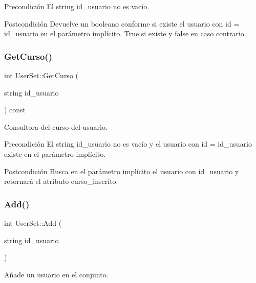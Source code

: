 \begin{DoxyPrecond}{Precondición}
El string id\+\_\+usuario no es vacío. 
\end{DoxyPrecond}
\begin{DoxyPostcond}{Postcondición}
Devuelve un booleano conforme si existe el usuario con id = id\+\_\+usuario en el parámetro implícito. True si existe y false en caso contrario. 
\end{DoxyPostcond}
\mbox{\label{class_user_set_a20c73031d173fac4db788598ea20ce79}} 
\subsubsection{\texorpdfstring{Get\+Curso()}{GetCurso()}}
{\footnotesize\ttfamily int User\+Set\+::\+Get\+Curso (\begin{DoxyParamCaption}\item[{string}]{id\+\_\+usuario }\end{DoxyParamCaption}) const}



Consultora del curso del usuario. 

\begin{DoxyPrecond}{Precondición}
El string id\+\_\+usuario no es vacío y el usuario con id = id\+\_\+usuario existe en el parámetro implícito. 
\end{DoxyPrecond}
\begin{DoxyPostcond}{Postcondición}
Busca en el parámetro implícito el usuario con id\+\_\+usuario y retornará el atributo curso\+\_\+inscrito. 
\end{DoxyPostcond}
\mbox{\label{class_user_set_af0b143d52582d95f08ad92c9eee64394}} 
\subsubsection{\texorpdfstring{Add()}{Add()}}
{\footnotesize\ttfamily int User\+Set\+::\+Add (\begin{DoxyParamCaption}\item[{string}]{id\+\_\+usuario }\end{DoxyParamCaption})}



Añade un usuario en el conjunto. 

